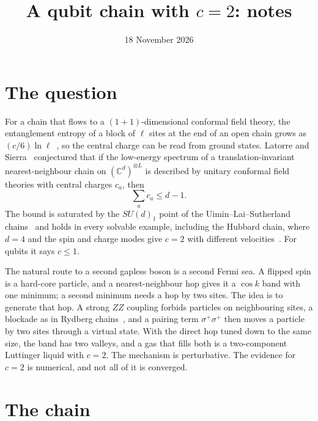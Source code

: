 \documentclass[11pt]{article}
\title{A qubit chain with $c=2$: notes}
\author{}
\date{18 November 2026}
\begin{document}
\maketitle

\section{The question}

For a chain that flows to a $(1+1)$-dimensional conformal field theory, the entanglement entropy of a block of $\ell$ sites at the end of an open chain grows as $(c/6)\ln\ell$~\cite{HLW,VLRK,CC}, so the central charge can be read from ground states. Latorre and Sierra~\cite{LS} conjectured that if the low-energy spectrum of a translation-invariant nearest-neighbour chain on $(\mathbb C^d)^{\otimes L}$ is described by unitary conformal field theories with central charges $c_a$, then
\begin{equation}
\sum_a c_a\le d-1 .
\label{eq:cd}
\end{equation}
The bound is saturated by the $SU(d)_1$ point of the Uimin--Lai--Sutherland chains~\cite{Sutherland} and holds in every solvable example, including the Hubbard chain, where $d=4$ and the spin and charge modes give $c=2$ with different velocities~\cite{Hubbard}. For qubits it says $c\le1$.

The natural route to a second gapless boson is a second Fermi sea. A flipped spin is a hard-core particle, and a nearest-neighbour hop gives it a $\cos k$ band with one minimum; a second minimum needs a hop by two sites. The idea is to generate that hop. A strong $ZZ$ coupling forbids particles on neighbouring sites, a blockade as in Rydberg chains~\cite{FSS,Bernien}, and a pairing term $\sigma^+\sigma^+$ then moves a particle by two sites through a virtual state. With the direct hop tuned down to the same size, the band has two valleys, and a gas that fills both is a two-component Luttinger liquid with $c=2$. The mechanism is perturbative. The evidence for $c=2$ is numerical, and not all of it is converged.

\section{The chain}
\end{document}
